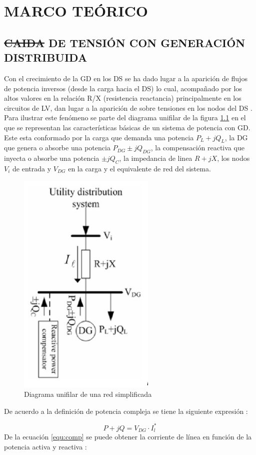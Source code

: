 \documentclass[12pt, letterpaper]{report}
\providecommand{\DIFaddtex}[1]{{\protect\color{blue}\uwave{#1}}} %
\providecommand{\DIFdeltex}[1]{{\protect\color{red}\sout{#1}}}                      %
\providecommand{\DIFaddbegin}{} %
\providecommand{\DIFaddend}{} %
\providecommand{\DIFdelbegin}{} %
\providecommand{\DIFdelend}{} %
\providecommand{\DIFadd}[1]{\texorpdfstring{\DIFaddtex{#1}}{#1}} %
\providecommand{\DIFdel}[1]{\texorpdfstring{\DIFdeltex{#1}}{}} %
\begin{document}
\chapter{MARCO TEÓRICO}
\DIFdelbegin %

\DIFdelend \DIFaddbegin \label{cap:teorico}
\DIFaddend \section{\DIFdelbegin \DIFdel{CAIDA }\DIFdelend \DIFaddbegin \DIFadd{CAÍDA }\DIFaddend DE TENSIÓN CON GENERACIÓN DISTRIBUIDA}
Con el crecimiento de la GD \cite{Cao2016} en los DS se ha dado lugar a la aparición de flujos de potencia inversos (desde la carga hacia el DS) lo cual, acompañado por los altos valores en la relación R/X (resistencia reactancia) principalmente en los circuitos de LV, dan lugar a la aparición de sobre tensiones en los nodos del  DS \cite{su2009comparative}\cite{Tang2017}.\\
Para ilustrar este fenómeno se parte  del diagrama unifilar de la figura \ref{fig:dos_nodos} en el que se representan las características básicas de un sistema de potencia con GD. Este esta conformado por la carga que demanda una potencia $P_{L}+jQ_{L}$, la DG que genera o absorbe una potencia $P_{DG}\pm jQ_{DG}$,  la compensación reactiva que inyecta o absorbe una potencia $\pm jQ_{C}$, la impedancia de linea $R+jX$,  los nodos $V_{i} $ de entrada y $V_{DG}$ en la carga y el equivalente de red del sistema.\\
\begin{figure}[H]
    \centering
    \caption{Diagrama unifilar de una red simplificada}
    \label{fig:dos_nodos}
    \includegraphics[width=0.2\linewidth]{imagenes/cap_1/dos_nodos}
\end{figure}
De acuerdo a la definición de potencia compleja se tiene la siguiente expresión \cite{Akagi2017}:

\begin{equation}
\label{equ:comp}
P + jQ = V_{DG} \cdot I_{l}^{*}
\end{equation}
De la ecuación \ref{equ:comp}  se puede obtener  la corriente de línea en función de la potencia activa y reactiva :
\end{document}
